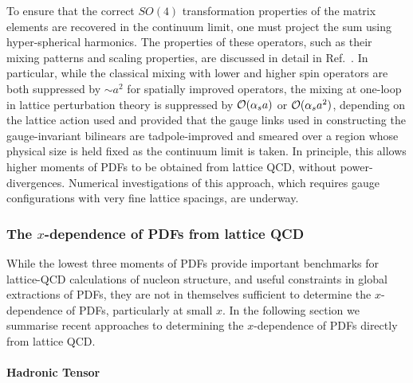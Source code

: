 To ensure that the correct $SO(4)$ transformation properties of the matrix elements are recovered in the continuum limit, one must project the sum using hyper-spherical harmonics.
%
The properties of these operators, such as their mixing patterns and scaling properties, are discussed in detail in
Ref.~\cite{Davoudi:2012ya}.
%
In particular, while the classical mixing with lower and higher spin operators are both suppressed by $\sim a^2$ for spatially improved operators, the mixing at one-loop in lattice perturbation theory is suppressed by ${\cal O}(\alpha_s a)$ or ${\cal O}(\alpha_s a^2)$, depending on the lattice action used and provided that the gauge links used in constructing the gauge-invariant bilinears are tadpole-improved and smeared over a region whose physical size is held fixed as the continuum limit is taken. In principle, this allows higher moments of PDFs to be obtained from lattice QCD, without power-divergences. Numerical investigations of this approach,
which requires gauge configurations with very fine lattice spacings, are underway.

\subsubsection{The $x$-dependence of PDFs from lattice QCD}

While the lowest three moments of PDFs provide important benchmarks for lattice-QCD calculations of nucleon structure, and useful constraints in global extractions of PDFs, they are not in themselves sufficient to determine the $x$-dependence of PDFs, particularly at small $x$.
%
In the following section we summarise recent approaches to determining the $x$-dependence of PDFs directly from lattice QCD.

\paragraph*{Hadronic Tensor} 




